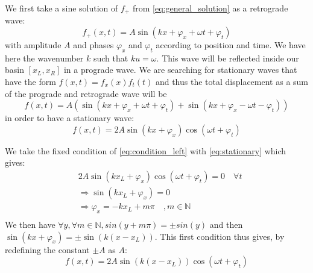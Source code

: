 We first take a sine solution of $f_+$ from \autoref{eq:general_solution} as a retrograde wave:
\begin{equation}
    f_+(x,t) = A \sin(kx + \varphi_x + \omega t + \varphi_t)
\end{equation}
with amplitude $A$ and phases $\varphi_x$ and $\varphi_t$ according to position and time. We have here the wavenumber $k$ such that $ku = \omega$. This wave will be reflected inside our basin $[x_L, x_R]$ in a prograde wave. We are searching for stationary waves that have the form $f(x,t) = f_x(x)f_t(t)$ and thus the total displacement as a sum of the prograde and retrograde wave will be
\begin{equation}
    f(x,t) = A(\sin(kx + \varphi_x + \omega t + \varphi_t) + \sin(kx + \varphi_x - \omega t - \varphi_t))
\end{equation}
in order to have a stationary wave:
\begin{equation}
    f(x,t) = 2A\sin(kx + \varphi_x)\cos(\omega t + \varphi_t)
    \label{eq:stationary}
\end{equation}

We take the fixed condition of \autoref{eq:condition_left} with \autoref{eq:stationary} which gives:
\[
    \begin{aligned}
        & 2A\sin(kx_L + \varphi_x)\cos(\omega t + \varphi_t) = 0 \quad \forall t \\
        & \Rightarrow \sin(kx_L + \varphi_x) = 0 \\
        & \Rightarrow \varphi_x = -kx_L + m\pi \quad , m \in \mathbb{N}\\
    \end{aligned}    
\]
We then have $\forall y, \forall m \in \mathbb{N}, sin(y+m\pi) = \pm sin(y)$ and then $\sin(kx + \varphi_x) = \pm \sin(k(x-x_L))$. This first condition thus gives, by redefining the constant $\pm A$ as $A$:
\begin{equation}
    f(x,t) = 2A\sin(k(x-x_L))\cos(\omega t + \varphi_t)
    \label{eq:sol_first_condition}
\end{equation}

